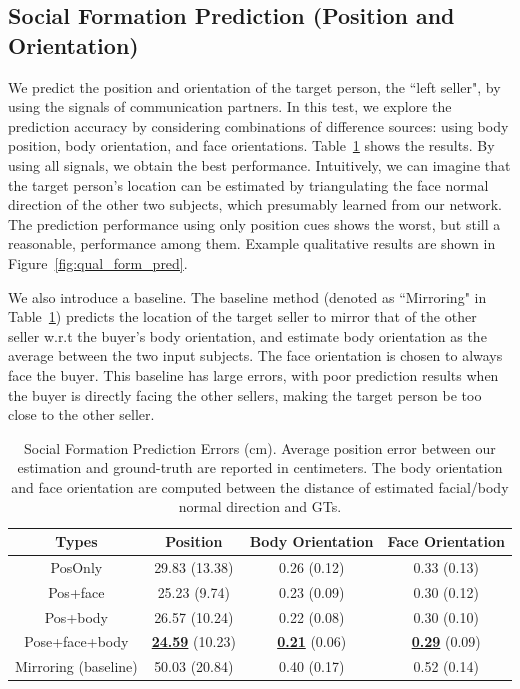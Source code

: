 \subsection{Social Formation Prediction (Position and Orientation)}
We predict the position and orientation of the target person, the ``left seller", by using the signals of communication partners. In this test, we explore the prediction accuracy by considering combinations of difference sources: using body position, body orientation, and face orientations. Table~\ref{table:predForm_errors} shows the results. By using all signals, we obtain the best performance. Intuitively, we can imagine that the target person's location can be estimated by triangulating the face normal direction of the other two subjects, which presumably learned from our network. The prediction performance using only position cues shows the worst, but still a reasonable, performance among them. Example qualitative results are shown in Figure~\ref{fig:qual_form_pred}.

We also introduce a baseline. The baseline method (denoted as ``Mirroring" in Table~\ref{table:predForm_errors}) predicts the location of the target seller to mirror that of the other seller w.r.t the buyer's body orientation, and estimate body orientation as the average between the two input subjects. The face orientation is chosen to always face the buyer. This baseline has large errors, with poor prediction results when the buyer is directly facing the other sellers, making the target person be too close to the other seller. 



\begin{table}[t]
	\centering
	\begin{tabular}{c| c| c| c}
		\hline
		Types & Position & Body Orientation & Face Orientation\\
		\hline
		PosOnly & 29.83 (13.38) & 0.26 (0.12) & 0.33 (0.13) \\
		\hline
		Pos+face & 25.23 (9.74) & 0.23 (0.09) & 0.30 (0.12) \\
		\hline
		Pos+body & 26.57 (10.24) & 0.22 (0.08) & 0.30 (0.10) \\
		\hline
		Pose+face+body & \underline {\textbf{24.59}} (10.23) &  \underline {\textbf{0.21}} (0.06) &  \underline {\textbf{0.29}} (0.09) \\
		\hline
		Mirroring (baseline) &  50.03 (20.84) & 0.40 (0.17) & 0.52 (0.14) \\
		\hline
	\end{tabular}
	\caption{Social Formation Prediction Errors (cm). Average position error between our estimation and ground-truth are reported in centimeters. The body orientation and face orientation are computed between the distance of estimated facial/body normal direction and GTs.\label{table:predForm_errors}}
\end{table}



